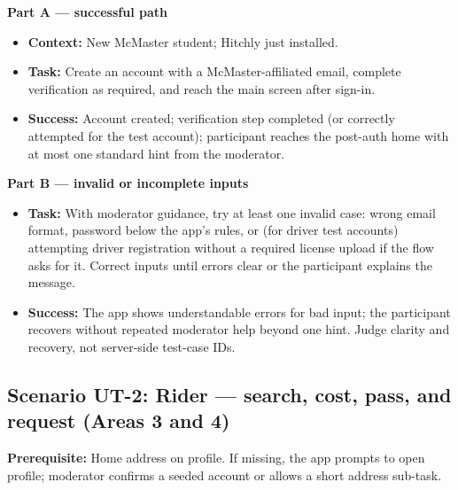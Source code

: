 \textbf{Part A --- successful path}

\begin{itemize}
  \item \textbf{Context:} New McMaster student; Hitchly just installed.
  \item \textbf{Task:} Create an account with a McMaster-affiliated email, complete verification as required, and reach the main screen after sign-in.
  \item \textbf{Success:} Account created; verification step completed (or correctly attempted for the test account); participant reaches the post-auth home with at most one standard hint from the moderator.
\end{itemize}

\textbf{Part B --- invalid or incomplete inputs}

\begin{itemize}
  \item \textbf{Task:} With moderator guidance, try at least one invalid case: wrong email format, password below the app's rules, or (for driver test accounts) attempting driver registration without a required license upload if the flow asks for it. Correct inputs until errors clear or the participant explains the message.
  \item \textbf{Success:} The app shows understandable errors for bad input; the participant recovers without repeated moderator help beyond one hint. Judge clarity and recovery, not server-side test-case IDs.
\end{itemize}

\subsection{Scenario UT-2: Rider --- search, cost, pass, and request (Areas 3 and 4)}

\textbf{Prerequisite:} Home address on profile. If missing, the app prompts to open profile; moderator confirms a seeded account or allows a short address sub-task.

